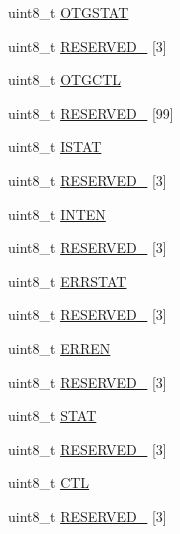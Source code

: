 \begin{DoxyCompactItemize}
\item 
uint8\+\_\+t \hyperlink{struct_u_s_b___mem_map_a0398fe890efd8110f3d182e7fcb8a0c5}{O\+T\+G\+S\+T\+AT}
\item 
uint8\+\_\+t \hyperlink{struct_u_s_b___mem_map_a9e2e1747e92f86edb0c8e9279c76c5ad}{R\+E\+S\+E\+R\+V\+E\+D\+\_} \mbox{[}3\mbox{]}
\item 
uint8\+\_\+t \hyperlink{struct_u_s_b___mem_map_a615eaa9b0200d66323e8ee2650a49164}{O\+T\+G\+C\+TL}
\item 
uint8\+\_\+t \hyperlink{struct_u_s_b___mem_map_a369f01d9d4b8ac2f5aced9d041bca57e}{R\+E\+S\+E\+R\+V\+E\+D\+\_} \mbox{[}99\mbox{]}
\item 
uint8\+\_\+t \hyperlink{struct_u_s_b___mem_map_aa88345921ba963631cba089504b96c19}{I\+S\+T\+AT}
\item 
uint8\+\_\+t \hyperlink{struct_u_s_b___mem_map_ab587ffb40eafb0bd3aaf062064d3b150}{R\+E\+S\+E\+R\+V\+E\+D\+\_} \mbox{[}3\mbox{]}
\item 
uint8\+\_\+t \hyperlink{struct_u_s_b___mem_map_aa19462850c5085330e53ed19397f6e1e}{I\+N\+T\+EN}
\item 
uint8\+\_\+t \hyperlink{struct_u_s_b___mem_map_ae366f5847b944969f82b5cbd5cdc7da0}{R\+E\+S\+E\+R\+V\+E\+D\+\_} \mbox{[}3\mbox{]}
\item 
uint8\+\_\+t \hyperlink{struct_u_s_b___mem_map_ad86f18ee95df11168d4b6cf68578e0fa}{E\+R\+R\+S\+T\+AT}
\item 
uint8\+\_\+t \hyperlink{struct_u_s_b___mem_map_ae1aee1d0c478ae6ee074f614670eafd7}{R\+E\+S\+E\+R\+V\+E\+D\+\_} \mbox{[}3\mbox{]}
\item 
uint8\+\_\+t \hyperlink{struct_u_s_b___mem_map_a810f265a9ad6dc0f51834d0cecf24a79}{E\+R\+R\+EN}
\item 
uint8\+\_\+t \hyperlink{struct_u_s_b___mem_map_a60b8bb28c42b316a1f9bf655e900a39e}{R\+E\+S\+E\+R\+V\+E\+D\+\_} \mbox{[}3\mbox{]}
\item 
uint8\+\_\+t \hyperlink{struct_u_s_b___mem_map_acad1a20eb41fab37316b6b7b98c00053}{S\+T\+AT}
\item 
uint8\+\_\+t \hyperlink{struct_u_s_b___mem_map_a2c373821485abf12490a7676e60615ad}{R\+E\+S\+E\+R\+V\+E\+D\+\_} \mbox{[}3\mbox{]}
\item 
uint8\+\_\+t \hyperlink{struct_u_s_b___mem_map_a52b35d0e8644631558a65f9b7a9b8b4b}{C\+TL}
\item 
uint8\+\_\+t \hyperlink{struct_u_s_b___mem_map_a927a6a42a1916fc3c31e4c19619f8a7d}{R\+E\+S\+E\+R\+V\+E\+D\+\_} \mbox{[}3\mbox{]}
\item 

\end{DoxyCompactItemize}
